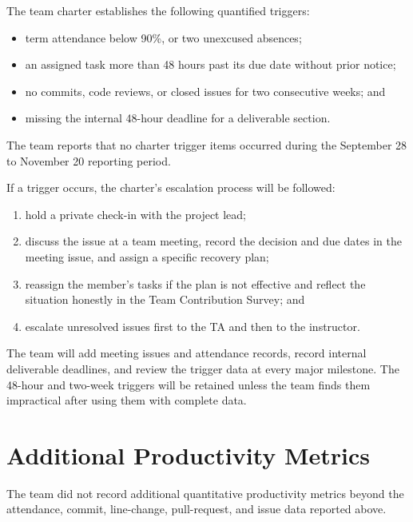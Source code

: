 \documentclass{article}
\begin{document}
The team charter establishes the following quantified triggers:
\begin{itemize}
    \item term attendance below 90\%, or two unexcused absences;
    \item an assigned task more than 48 hours past its due date without prior
    notice;
    \item no commits, code reviews, or closed issues for two consecutive weeks;
    and
    \item missing the internal 48-hour deadline for a deliverable section.
\end{itemize}

The team reports that no charter trigger items occurred during the September
28 to November 20 reporting period.

If a trigger occurs, the charter's escalation process will be followed:
\begin{enumerate}
    \item hold a private check-in with the project lead;
    \item discuss the issue at a team meeting, record the decision and due dates
    in the meeting issue, and assign a specific recovery plan;
    \item reassign the member's tasks if the plan is not effective and reflect
    the situation honestly in the Team Contribution Survey; and
    \item escalate unresolved issues first to the TA and then to the
    instructor.
\end{enumerate}

The team will add meeting issues and attendance records, record internal
deliverable deadlines, and review the trigger data at every major milestone.
The 48-hour and two-week triggers will be retained unless the team finds them
impractical after using them with complete data.

\section{Additional Productivity Metrics}

The team did not record additional quantitative productivity metrics beyond
the attendance, commit, line-change, pull-request, and issue data reported
above.
\end{document}
